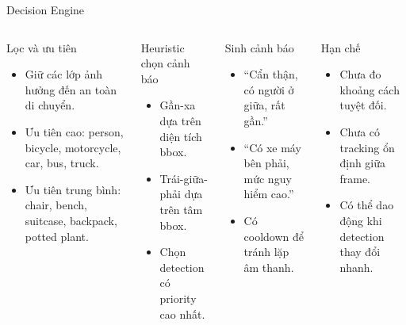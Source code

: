 \documentclass[aspectratio=169]{beamer}
\begin{document}
\begin{frame}{Decision Engine}
  \begin{columns}[T,onlytextwidth]
    \begin{block}{Lọc và ưu tiên}
      \begin{itemize}
        \item Giữ các lớp ảnh hưởng đến an toàn di chuyển.
        \item Ưu tiên cao: person, bicycle, motorcycle, car, bus, truck.
        \item Ưu tiên trung bình: chair, bench, suitcase, backpack, potted plant.
      \end{itemize}
    \end{block}
    \begin{block}{Heuristic chọn cảnh báo}
      \begin{itemize}
        \item Gần-xa dựa trên diện tích bbox.
        \item Trái-giữa-phải dựa trên tâm bbox.
        \item Chọn detection có priority cao nhất.
      \end{itemize}
    \end{block}
    \begin{exampleblock}{Sinh cảnh báo}
      \begin{itemize}
        \item “Cẩn thận, có người ở giữa, rất gần.”
        \item “Có xe máy bên phải, mức nguy hiểm cao.”
        \item Có cooldown để tránh lặp âm thanh.
      \end{itemize}
    \end{exampleblock}
    \begin{block}{Hạn chế}
      \begin{itemize}
        \item Chưa đo khoảng cách tuyệt đối.
        \item Chưa có tracking ổn định giữa frame.
        \item Có thể dao động khi detection thay đổi nhanh.
      \end{itemize}
    \end{block}
  \end{columns}
\end{frame}
\end{document}
